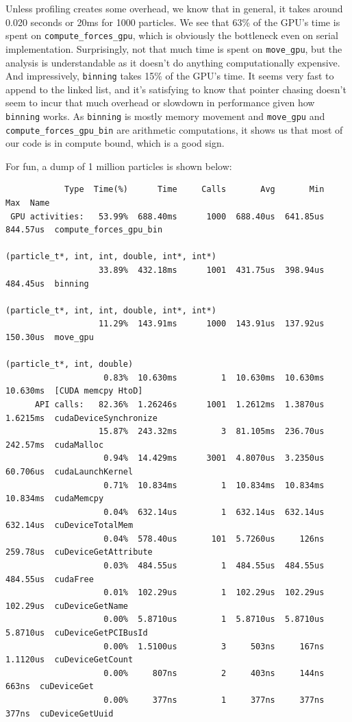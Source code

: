 \documentclass{article}
\begin{document}
Unless profiling creates some overhead, we know that in general, it takes around 0.020 seconds or 20ms for 1000 particles. We see that 63\% of the GPU's time is spent on \verb|compute_forces_gpu|, which is obviously the bottleneck even on serial implementation. Surprisingly, not that much time is spent on \verb|move_gpu|, but the analysis is understandable as it doesn't do anything computationally expensive. And impressively, 
\verb|binning| takes 15\% of the GPU's time. It seems very fast to append to the linked list, and it's satisfying to know that pointer chasing doesn't seem to incur that much overhead or slowdown in performance given how \verb|binning| works. As \verb|binning| is mostly memory movement and \verb|move_gpu| and \verb|compute_forces_gpu_bin| are arithmetic computations, it shows us that most of our code is in compute bound, which is a good sign.

For fun, a dump of 1 million particles is shown below:

\begin{verbatim}
            Type  Time(%)      Time     Calls       Avg       Min       Max  Name
 GPU activities:   53.99%  688.40ms      1000  688.40us  641.85us  844.57us  compute_forces_gpu_bin
                                                            (particle_t*, int, int, double, int*, int*)
                   33.89%  432.18ms      1001  431.75us  398.94us  484.45us  binning
                                                            (particle_t*, int, int, double, int*, int*)
                   11.29%  143.91ms      1000  143.91us  137.92us  150.30us  move_gpu
                                                            (particle_t*, int, double)
                    0.83%  10.630ms         1  10.630ms  10.630ms  10.630ms  [CUDA memcpy HtoD]
      API calls:   82.36%  1.26246s      1001  1.2612ms  1.3870us  1.6215ms  cudaDeviceSynchronize
                   15.87%  243.32ms         3  81.105ms  236.70us  242.57ms  cudaMalloc
                    0.94%  14.429ms      3001  4.8070us  3.2350us  60.706us  cudaLaunchKernel
                    0.71%  10.834ms         1  10.834ms  10.834ms  10.834ms  cudaMemcpy
                    0.04%  632.14us         1  632.14us  632.14us  632.14us  cuDeviceTotalMem
                    0.04%  578.40us       101  5.7260us     126ns  259.78us  cuDeviceGetAttribute
                    0.03%  484.55us         1  484.55us  484.55us  484.55us  cudaFree
                    0.01%  102.29us         1  102.29us  102.29us  102.29us  cuDeviceGetName
                    0.00%  5.8710us         1  5.8710us  5.8710us  5.8710us  cuDeviceGetPCIBusId
                    0.00%  1.5100us         3     503ns     167ns  1.1120us  cuDeviceGetCount
                    0.00%     807ns         2     403ns     144ns     663ns  cuDeviceGet
                    0.00%     377ns         1     377ns     377ns     377ns  cuDeviceGetUuid
\end{verbatim}
\end{document}
